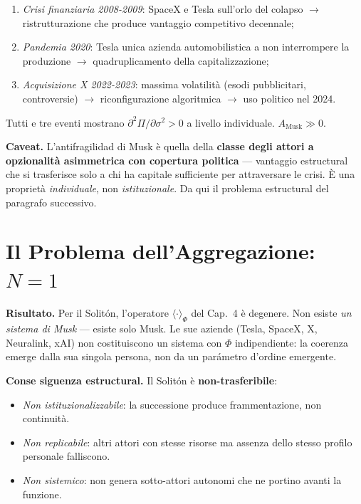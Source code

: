 \begin{enumerate}
\def\labelenumi{\arabic{enumi}.}
\tightlist
\item
  \emph{Crisi finanziaria 2008-2009}: SpaceX e Tesla sull'orlo del
  colapso $\to$ ristrutturazione che produce vantaggio competitivo
  decennale;
\item
  \emph{Pandemia 2020}: Tesla unica azienda automobilistica a non
  interrompere la produzione $\to$ quadruplicamento della capitalizzazione;
\item
  \emph{Acquisizione X 2022-2023}: massima volatilità (esodi
  pubblicitari, controversie) $\to$ riconfigurazione algoritmica $\to$ uso
  politico nel 2024.
\end{enumerate}

\Proved{} Tutti e tre eventi mostrano
\(\partial^2 \Pi / \partial \sigma^2 > 0\) a livello individuale.
\(A_{\text{Musk}} \gg 0\).

\Conj{} \textbf{Caveat.} L'antifragilidad di Musk è quella della
\textbf{classe degli attori a opzionalità asimmetrica con copertura
politica} --- vantaggio estructural che si trasferisce solo a chi ha
capitale sufficiente per attraversare le crisi. È una proprietà
\emph{individuale}, non \emph{istituzionale}. Da qui il problema
estructural del paragrafo successivo.



\section{\texorpdfstring{Il Problema dell'Aggregazione:
\(N = 1\)}{Il Problema dell'Aggregazione: N = 1}}\label{il-problema-dellaggregazione-n-1}

\Proved{} \textbf{Risultato.} Per il Solitón, l'operatore
\(\langle\cdot\rangle_\Phi\) del Cap.~4 è degenere. Non esiste \emph{un
sistema di Musk} --- esiste solo Musk. Le sue aziende (Tesla, SpaceX, X,
Neuralink, xAI) non costituiscono un sistema con \(\Phi\) indipendiente:
la coerenza emerge dalla sua singola persona, non da un parámetro
d'ordine emergente.

\Hypoth{} \textbf{Conse siguenza estructural.} Il Solitón è
\textbf{non-trasferibile}:

\begin{itemize}
\tightlist
\item
  \emph{Non istituzionalizzabile}: la successione produce
  frammentazione, non continuità.
\item
  \emph{Non replicabile}: altri attori con stesse risorse ma assenza
  dello stesso profilo personale falliscono.
\item
  \emph{Non sistemico}: non genera sotto-attori autonomi che ne portino
  avanti la funzione.
\end{itemize}

